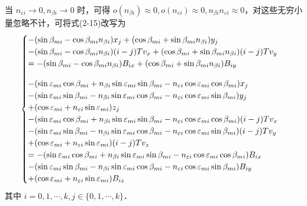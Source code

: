 当 $n_{\varepsilon i}\rightarrow 0 , n_{\beta i} \rightarrow 0$ 时，可得 $o(n_{\beta i}) \approx 0, o(n_{\varepsilon i}) \approx 0, n_{\beta i}n_{\varepsilon i} \approx 0$，对这些无穷小量忽略不计，可将式(2-15)改写为
\begin{equation}
	\begin{cases}
		-(\sin\beta_{mi} - \cos\beta_{mi}n_{\beta i})x_j +(\cos\beta_{mi} + \sin\beta_{mi}n_{\beta i})y_j \\
		-(\sin\beta_{mi} - \cos\beta_{mi}n_{\beta i})(i-j)T v_x +(\cos\beta_{mi} + \sin\beta_{mi}n_{\beta i})(i-j)T v_y \\ \vspace{10pt}
		=-(\sin\beta_{mi} - \cos\beta_{mi}n_{\beta i})B_{ix} +(\cos\beta_{mi} + \sin\beta_{mi}n_{\beta i})B_{iy} \\ 
		-(\sin\varepsilon_{mi}\cos\beta_{mi} + n_{\beta i}\sin\varepsilon_{mi}\sin\beta_{mi} -n_{\varepsilon i}\cos\varepsilon_{mi}\cos\beta_{mi})x_j \\
		-(\sin\varepsilon_{mi}\sin\beta_{mi} -n_{\beta i}\sin\varepsilon_{mi}\cos\beta_{mi} - n_{\varepsilon i}\cos\varepsilon_{mi}\sin\beta_{mi})y_j \\ 
		+(\cos\varepsilon_{mi} + n_{\varepsilon i}\sin\varepsilon_{mi})z_j \\
		-(\sin\varepsilon_{mi}\cos\beta_{mi} + n_{\beta i}\sin\varepsilon_{mi}\sin\beta_{mi} -n_{\varepsilon i}\cos\varepsilon_{mi}\cos\beta_{mi})(i-j)T v_x \\
		-(\sin\varepsilon_{mi}\sin\beta_{mi} -n_{\beta i}\sin\varepsilon_{mi}\cos\beta_{mi} -n_{\varepsilon i} \cos\varepsilon_{mi}\sin\beta_{mi})(i-j)T v_y \\
		+(\cos\varepsilon_{mi} + n_{\varepsilon i}\sin\varepsilon_{mi})(i-j)T v_z \\
		=-(\sin\varepsilon_{mi}\cos\beta_{mi} +n_{\beta i} \sin\varepsilon_{mi}\sin\beta_{mi} -n_{\varepsilon i}\cos\varepsilon_{mi}\cos\beta_{mi})B_{ix} \\
		-(\sin\varepsilon_{mi}\sin\beta_{mi} -n_{\beta i}\sin\varepsilon_{mi}\cos\beta_{mi} -n_{\varepsilon i} \cos\varepsilon_{mi}\sin\beta_{mi})B_{iy} \\
		+(\cos\varepsilon_{mi} + n_{\varepsilon i}\sin\varepsilon_{mi})B_{iz} \\
	\end{cases}
\end{equation}
其中 $i=0,1,\cdots,k,j \in \lbrace 0,1,\cdots, k \rbrace$．

